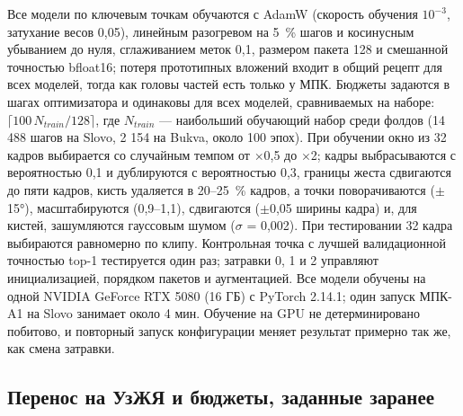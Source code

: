 \documentclass[a4paper,fleqn]{cas-dc}
\begin{document}
Все модели по ключевым точкам обучаются с AdamW (скорость обучения \(10^{-3}\), затухание весов 0,05), линейным разогревом на 5~\% шагов и косинусным убыванием до нуля, сглаживанием меток 0,1, размером пакета 128 и смешанной точностью bfloat16; потеря прототипных вложений входит в общий рецепт для всех моделей, тогда как головы частей есть только у МПК. Бюджеты задаются в шагах оптимизатора и одинаковы для всех моделей, сравниваемых на наборе: \(\lceil 100\,N_{train}/128 \rceil\), где \(N_{train}\) --- наибольший обучающий набор среди фолдов (14 488 шагов на Slovo, 2 154 на Bukva, около 100 эпох). При обучении окно из 32 кадров выбирается со случайным темпом от $\times$0,5 до $\times$2; кадры выбрасываются с вероятностью 0,1 и дублируются с вероятностью 0,3, границы жеста сдвигаются до пяти кадров, кисть удаляется в 20--25~\% кадров, а точки поворачиваются ($\pm$15°), масштабируются (0,9--1,1), сдвигаются ($\pm$0,05 ширины кадра) и, для кистей, зашумляются гауссовым шумом (\(\sigma\) = 0,002). При тестировании 32 кадра выбираются равномерно по клипу. Контрольная точка с лучшей валидационной точностью top-1 тестируется один раз; затравки 0, 1 и 2 управляют инициализацией, порядком пакетов и аугментацией. Все модели обучены на одной NVIDIA GeForce RTX 5080 (16 ГБ) с PyTorch 2.14.1; один запуск МПК-A1 на Slovo занимает около 4 мин. Обучение на GPU не детерминировано побитово, и повторный запуск конфигурации меняет результат примерно так же, как смена затравки.

\hypertarget{ux43fux435ux440ux435ux43dux43eux441-ux43dux430-ux443ux437ux436ux44f-ux438-ux431ux44eux434ux436ux435ux442ux44b-ux437ux430ux434ux430ux43dux43dux44bux435-ux437ux430ux440ux430ux43dux435ux435}{%
\subsection{Перенос на УзЖЯ и бюджеты, заданные заранее}\label{ux43fux435ux440ux435ux43dux43eux441-ux43dux430-ux443ux437ux436ux44f-ux438-ux431ux44eux434ux436ux435ux442ux44b-ux437ux430ux434ux430ux43dux43dux44bux435-ux437ux430ux440ux430ux43dux435ux435}}
\end{document}
